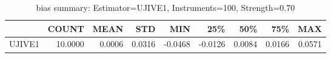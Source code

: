 \begin{table}[ht]
\centering
\caption{bias summary: Estimator=UJIVE1, Instruments=100, Strength=0.70}
\begin{tabular}{lrrrrrrrr}
\toprule
 & COUNT & MEAN & STD & MIN & 25\% & 50\% & 75\% & MAX \\
\midrule
UJIVE1 & 10.0000 & 0.0006 & 0.0316 & -0.0468 & -0.0126 & 0.0084 & 0.0166 & 0.0571 \\
\bottomrule
\end{tabular}
\end{table}

